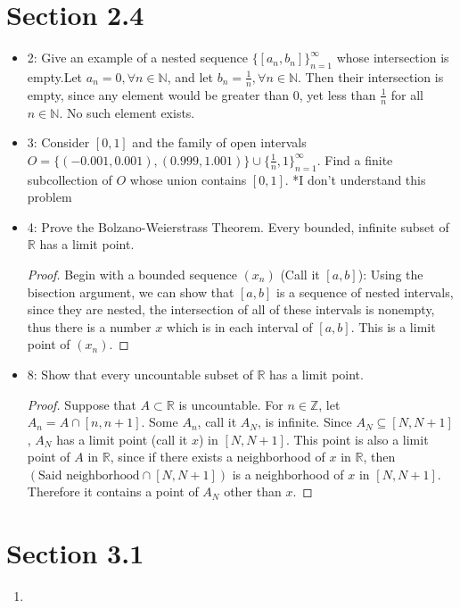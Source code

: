 \documentclass[hidelinks,12pt]{article}
\theoremstyle{definition}
\newcommand{\R}{\mathbb{R}}
\newcommand{\N}{\mathbb{N}}
\newcommand{\Z}{\mathbb{Z}}
\begin{document}
\section{Section 2.4}
\begin{itemize}
    \item 2: Give an example of a nested sequence $\{[a_n,b_n]\}_{n=1}^{\infty}$ whose intersection is empty.\newline Let $a_n=0,\forall n\in\N$, and let $b_n=\frac{1}{n},\forall n\in\N$. Then their intersection is empty, since any element would be greater than 0, yet less than $\frac{1}{n}$ for all $n\in\N$. No such element exists.
    \item 3: Consider $[0,1]$ and the family of open intervals $O=\{(-0.001,0.001),(0.999,1.001)\}\cup\{\frac{1}{n},1\}_{n=1}^{\infty}$. Find a finite subcollection of $O$ whose union contains $[0,1]$. *I don't understand this problem
    \item 4: Prove the Bolzano-Weierstrass Theorem. Every bounded, infinite subset of $\R$ has a limit point. \begin{proof}Begin with a bounded sequence $(x_n)$ (Call it $[a,b]$): Using the bisection argument, we can show that $[a,b]$ is a sequence of nested intervals, since they are nested, the intersection of all of these intervals is nonempty, thus there is a number $x$ which is in each interval of $[a,b]$. This is a limit point of $(x_n)$.
    \end{proof}
    \item 8: Show that every uncountable subset of $\R$ has a limit point.\begin{proof} Suppose that $A\subset\R$ is uncountable. For $n\in\Z$, let $A_n=A\cap[n,n+1]$. Some $A_n$, call it $A_N$, is infinite. Since $A_N\subseteq[N,N+1]$, $A_N$ has a limit point (call it $x$) in $[N,N+1]$. This point is also a limit point of $A$ in $\R$, since if there exists a neighborhood of $x$ in $\R$, then $(\text{Said neighborhood}\cap[N,N+1])$ is a neighborhood of $x$ in $[N,N+1]$. Therefore it contains a point of $A_N$ other than $x$.
    \end{proof}
\end{itemize}
\section{Section 3.1}
\begin{enumerate}
    \item 
\end{enumerate}
\end{document}

